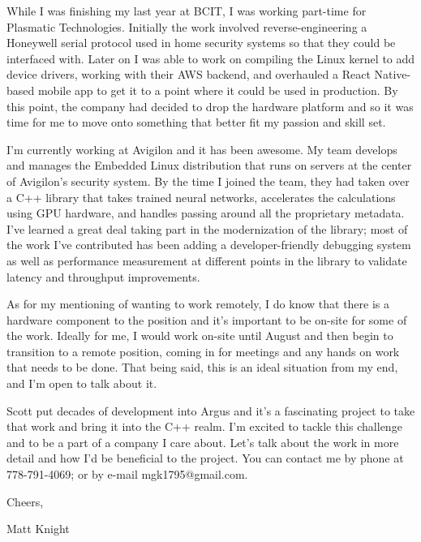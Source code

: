 \documentclass[letterpaper,11pt]{article}
\begin{document}
While I was finishing my last year at BCIT, I was working part-time for
Plasmatic Technologies. Initially the work involved reverse-engineering a
Honeywell serial protocol used in home security systems so that they could be
interfaced with. Later on I was able to work on compiling the Linux kernel to
add device drivers, working with their AWS backend, and overhauled a React
Native-based mobile app to get it to a point where it could be used in
production. By this point, the company had decided to drop the hardware platform
and so it was time for me to move onto something that better fit my passion and
skill set.

\vspace{1 em}

I'm currently working at Avigilon and it has been awesome. My team develops and
manages the Embedded Linux distribution that runs on servers at the center of
Avigilon's security system. By the time I joined the team, they had taken over a
C++ library that takes trained neural networks, accelerates the calculations
using GPU hardware, and handles passing around all the proprietary metadata.
I've learned a great deal taking part in the modernization of the library; most
of the work I've contributed has been adding a developer-friendly debugging
system as well as performance measurement at different points in the library to
validate latency and throughput improvements.

\vspace{1 em}

As for my mentioning of wanting to work remotely, I do know that there is a
hardware component to the position and it's important to be on-site for some of
the work. Ideally for me, I would work on-site until August and then begin to
transition to a remote position, coming in for meetings and any hands on work
that needs to be done. That being said, this is an ideal situation from my end,
and I'm open to talk about it.

\vspace{1 em}

Scott put decades of development into Argus and it's a fascinating project to
take that work and bring it into the C++ realm.  I'm excited to tackle this
challenge and to be a part of a company I care about.  Let's talk about the work
in more detail and how I'd be beneficial to the project. You can contact me by
phone at 778-791-4069; or by e-mail mgk1795@gmail.com.

\vspace{2 em}
Cheers,

Matt Knight
\end{document}
